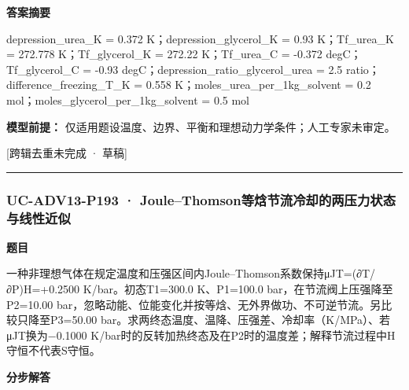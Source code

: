 \documentclass[UTF8,11pt,a4paper]{ctexart}
\begin{document}
\noindent\textbf{答案摘要}\par
depression\_urea\_K = 0.372 K；depression\_glycerol\_K = 0.93 K；Tf\_urea\_K = 272.778 K；Tf\_glycerol\_K = 272.22 K；Tf\_urea\_C = -0.372 degC；Tf\_glycerol\_C = -0.93 degC；depression\_ratio\_glycerol\_urea = 2.5 ratio；difference\_freezing\_T\_K = 0.558 K；moles\_urea\_per\_1kg\_solvent = 0.2 mol；moles\_glycerol\_per\_1kg\_solvent = 0.5 mol\par
\noindent\textbf{模型前提：}
仅适用题设温度、边界、平衡和理想动力学条件；人工专家未审定。\par
\noindent\textcolor{red!65!black}{[跨辑去重未完成 · 草稿]} \par
\medskip\hrule\medskip
{}
\subsubsection*{UC-ADV13-P193 · Joule–Thomson等焓节流冷却的两压力状态与线性近似}
\noindent\textbf{题目}\par
一种非理想气体在规定温度和压强区间内Joule–Thomson系数保持μJT=(∂T/∂P)H=+0.2500 K/bar。初态T1=300.0 K、P1=100.0 bar，在节流阀上压强降至P2=10.00 bar，忽略动能、位能变化并按等焓、无外界做功、不可逆节流。另比较只降至P3=50.00 bar。求两终态温度、温降、压强差、冷却率（K/MPa）、若μJT换为−0.1000 K/bar时的反转加热终态及在P2时的温度差；解释节流过程中H守恒不代表S守恒。\par
\medskip\noindent\textbf{分步解答}
\end{document}
